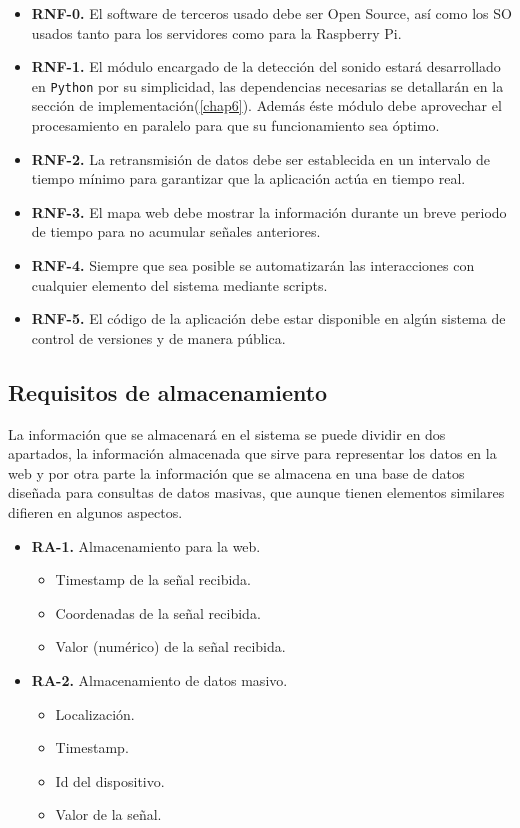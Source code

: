 \begin{itemize}
  \item \textbf{RNF-0.} El software de terceros usado debe ser Open Source, así como los SO usados tanto para los servidores como para la Raspberry Pi.
  \item \textbf{RNF-1.} El módulo encargado de la detección del sonido estará desarrollado en {\tt Python} por su simplicidad, las dependencias necesarias se detallarán en la sección de implementación(\ref{chap6}). Además éste módulo debe aprovechar el procesamiento en paralelo para que su funcionamiento sea óptimo.
  \item \textbf{RNF-2.} La retransmisión de datos debe ser establecida en un intervalo de tiempo mínimo para garantizar que la aplicación actúa en tiempo real.
  \item \textbf{RNF-3.} El mapa web debe mostrar la información durante un breve periodo de tiempo para no acumular señales anteriores.
  \item \textbf{RNF-4.} Siempre que sea posible se automatizarán las interacciones con cualquier elemento del sistema mediante scripts.
  \item \textbf{RNF-5.} El código de la aplicación debe estar disponible en algún sistema de control de versiones y de manera pública.
\end{itemize}

\subsection{Requisitos de almacenamiento}

La información que se almacenará en el sistema se puede dividir en dos apartados, la información almacenada que sirve para representar los datos en la web y por otra parte la información que se almacena en una base de datos diseñada para consultas de datos masivas, que aunque tienen elementos similares difieren en algunos aspectos.

\begin{itemize}
  \item \textbf{RA-1.} Almacenamiento para la web.
  \begin{itemize}
    \item Timestamp de la señal recibida.
    \item Coordenadas de la señal recibida.
    \item Valor (numérico) de la señal recibida.
  \end{itemize}
  \item \textbf{RA-2.} Almacenamiento de datos masivo.
  \begin{itemize}
    \item Localización.
    \item Timestamp.
    \item Id del dispositivo.
    \item Valor de la señal.
  \end{itemize}
\end{itemize}

